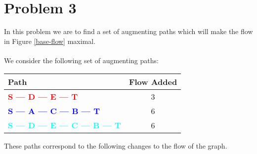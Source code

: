 \section*{Problem 3}

In this problem we are to find a set of augmenting paths which will 
make the flow in Figure \ref{base-flow} maximal. 
\\
\\
We consider the following set of augmenting paths:
\begin{center}
    \begin{tabular}{ l | c }
    \textbf{Path} & \textbf{Flow Added} \\
    \hline
    \textcolor{red}{\textbf{S --- D --- E --- T}} & 3 \\
    \textcolor{blue}{\textbf{S --- A --- C --- B --- T}} & 6 \\
    \textcolor{cyan}{\textbf{S --- D --- E --- C --- B --- T}} & 6 \\
    \end{tabular}
\end{center}

These paths correspond to the following changes to the flow of the
graph.

